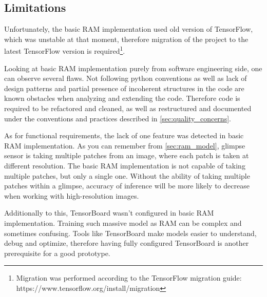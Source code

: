 \subsection{Limitations}
Unfortunately, the basic RAM implementation used old version of TensorFlow,
which was unstable at that moment, therefore migration of the project
to the latest TensorFlow version is required\footnote{
	Migration was performed according to the TensorFlow migration
	guide: https://www.tensorflow.org/install/migration
}.

Looking at basic RAM implementation purely from software engineering side,
one can observe several flaws. Not following python conventions as well
as lack of design patterns and partial presence of incoherent structures in the code
are known obstacles when analyzing and extending the code.
Therefore code is required to be refactored and cleaned,
as well as restructured and documented under the conventions and
practices described in \autoref{sec:quality_concerns}.


As for functional requirements, the lack of one feature was detected in basic RAM implementation.
As you can remember from \autoref{sec:ram_model}, glimpse sensor is taking
multiple patches from an image, where each patch is taken at different resolution.
The basic RAM implementation is not capable of taking multiple patches,
but only a single one. Without the ability of taking multiple patches within a glimpse,
accuracy of inference will be more likely to decrease when working with high-resolution
images.

Additionally to this, TensorBoard wasn't configured in basic RAM implementation.
Training such massive model as RAM can be complex and sometimes confusing.
Tools like TensorBoard make models easier to understand, debug
and optimize, therefore having fully configured TensorBoard is another
prerequisite for a good prototype.








